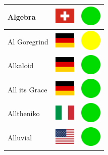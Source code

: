 \documentclass[12pt, a4paper, twoside]{report}
\begin{document}
\begin{center}
\begin{longtable}{|p{5cm}|p{2cm}|p{2cm}|}
 Algebra                                                    & \includegraphics[width=1cm]{../4x3/ch} &   \includegraphics[width=1cm]{../likes/y} \\ \hline
 Al Goregrind                                               & \includegraphics[width=1cm]{../4x3/de} &   \includegraphics[width=1cm]{../likes/m} \\ \hline
 Alkaloid                                                   & \includegraphics[width=1cm]{../4x3/de} &   \includegraphics[width=1cm]{../likes/y} \\ \hline
 All its Grace                                              & \includegraphics[width=1cm]{../4x3/de} &   \includegraphics[width=1cm]{../likes/y} \\ \hline
 Alltheniko                                                 & \includegraphics[width=1cm]{../4x3/it} &   \includegraphics[width=1cm]{../likes/y} \\ \hline
 Alluvial                                                   & \includegraphics[width=1cm]{../4x3/us} &   \includegraphics[width=1cm]{../likes/y} \\ \hline

\end{longtable}
\end{center}
\end{document}
